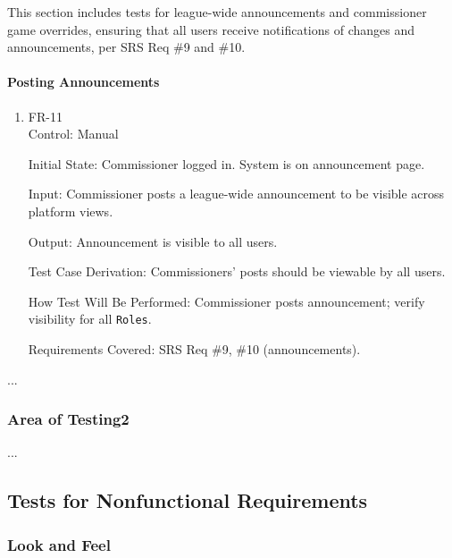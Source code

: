 \documentclass[12pt, titlepage]{article}
\begin{document}
This section includes tests for league-wide announcements and commissioner game overrides, ensuring that all users receive notifications of changes and announcements, per SRS Req \#9 and \#10.

\paragraph{Posting Announcements}

\begin{enumerate}

\item{FR-11\\}
Control: Manual

Initial State: Commissioner logged in. System is on announcement page.

Input: Commissioner posts a league-wide announcement to be visible across platform views.

Output: Announcement is visible to all users.

Test Case Derivation: Commissioners' posts should be viewable by all users.

How Test Will Be Performed: Commissioner posts announcement; verify visibility for all \texttt{Roles}.

Requirements Covered: SRS Req \#9, \#10 (announcements).
\end{enumerate}

...

\subsubsection{Area of Testing2}

...

\subsection{Tests for Nonfunctional Requirements}

\subsubsection{Look and Feel}
		
\end{document}
